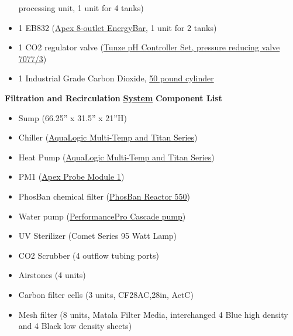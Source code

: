 \documentclass[]{book}
\providecommand{\tightlist}{%
  \setlength{\itemsep}{0pt}\setlength{\parskip}{0pt}}
\begin{document}
\begin{itemize}
  processing unit, 1 unit for 4 tanks)\\
\item
  1 EB832
  (\href{https://github.com/SilbigerLab/Mesocosm_User_Manual/blob/master/Manuals/EB832_Guide.pdf}{Apex
  8-outlet EnergyBar}, 1 unit for 2 tanks)\\
\item
  1 CO2 regulator valve
  (\href{https://github.com/SilbigerLab/Mesocosm_User_Manual/blob/master/Manuals/Tunze_CO2_Regulator.pdf}{Tunze
  pH Controller Set, pressure reducing valve 7077/3})\\
\item
  1 Industrial Grade Carbon Dioxide,
  \href{https://www.airgas.com/product/Gases/Industrial-Application-Gases/Carbon-Dioxide---Industrial/p/CD\%2050}{50
  pound cylinder}
\end{itemize}

 \textbf{Filtration and Recirculation}
\href{https://github.com/SilbigerLab/Mesocosm_User_Manual/blob/master/Manuals/Filtration_Skid_Build_Package.pdf}{\textbf{System}}
\textbf{Component List}

\begin{itemize}
\tightlist
\item
  Sump (66.25'' x 31.5'' x 21''H)\\
\item
  Chiller
  (\href{https://github.com/SilbigerLab/Mesocosm_User_Manual/blob/master/Manuals/AquaLogic_Chiller.pdf}{AquaLogic
  Multi-Temp and Titan Series})\\
\item
  Heat Pump
  (\href{https://github.com/SilbigerLab/Mesocosm_User_Manual/blob/master/Manuals/AquaLogic_Chiller.pdf}{AquaLogic
  Multi-Temp and Titan Series})\\
\item
  PM1
  (\href{https://github.com/SilbigerLab/Mesocosm_User_Manual/blob/master/Manuals/PM1_manual.pdf}{Apex
  Probe Module 1})\\
\item
  PhosBan chemical filter
  (\href{https://github.com/SilbigerLab/Mesocosm_User_Manual/blob/master/Manuals/Phosban_Reactor.pdf}{PhosBan
  Reactor 550})\\
\item
  Water pump
  (\href{https://github.com/SilbigerLab/Mesocosm_User_Manual/blob/master/Manuals/Complete_Cascade.pdf}{PerformancePro
  Cascade pump})\\
\item
  UV Sterilizer (Comet Series 95 Watt Lamp)\\
\item
  CO2 Scrubber (4 outflow tubing ports)
\item
  Airstones (4 units)\\
\item
  Carbon filter cells (3 units, CF28AC,28in, ActC)\\
\item
  Mesh filter (8 units, Matala Filter Media, interchanged 4 Blue high
  density and 4 Black low density sheets)
\end{itemize}
\end{document}
